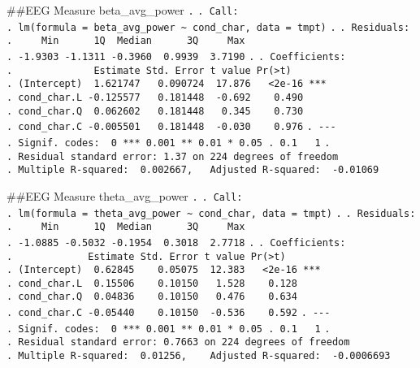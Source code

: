 \documentclass[
]{article}
\begin{document}
\#\#EEG Measure beta\_avg\_power \texttt{.} \texttt{.\ Call:}
\texttt{.\ lm(formula\ =\ beta\_avg\_power\ \textasciitilde{}\ cond\_char,\ data\ =\ tmpt)}
\texttt{.} \texttt{.\ Residuals:}
\texttt{.\ \ \ \ \ Min\ \ \ \ \ \ 1Q\ \ Median\ \ \ \ \ \ 3Q\ \ \ \ \ Max}
\texttt{.\ -1.9303\ -1.1311\ -0.3960\ \ 0.9939\ \ 3.7190} \texttt{.}
\texttt{.\ Coefficients:}
\texttt{.\ \ \ \ \ \ \ \ \ \ \ \ \ \ Estimate\ Std.\ Error\ t\ value\ Pr(\textgreater{}\textbar{}t\textbar{})}
\texttt{.\ (Intercept)\ \ 1.621747\ \ \ 0.090724\ \ 17.876\ \ \ \textless{}2e-16\ ***}
\texttt{.\ cond\_char.L\ -0.125577\ \ \ 0.181448\ \ -0.692\ \ \ \ 0.490}
\texttt{.\ cond\_char.Q\ \ 0.062602\ \ \ 0.181448\ \ \ 0.345\ \ \ \ 0.730}
\texttt{.\ cond\_char.C\ -0.005501\ \ \ 0.181448\ \ -0.030\ \ \ \ 0.976}
\texttt{.\ -\/-\/-}
\texttt{.\ Signif.\ codes:\ \ 0\ \textquotesingle{}***\textquotesingle{}\ 0.001\ \textquotesingle{}**\textquotesingle{}\ 0.01\ \textquotesingle{}*\textquotesingle{}\ 0.05\ \textquotesingle{}.\textquotesingle{}\ 0.1\ \textquotesingle{}\ \textquotesingle{}\ 1}
\texttt{.}
\texttt{.\ Residual\ standard\ error:\ 1.37\ on\ 224\ degrees\ of\ freedom}
\texttt{.\ Multiple\ R-squared:\ \ 0.002667,\ \ \ Adjusted\ R-squared:\ \ -0.01069}

\#\#EEG Measure theta\_avg\_power \texttt{.} \texttt{.\ Call:}
\texttt{.\ lm(formula\ =\ theta\_avg\_power\ \textasciitilde{}\ cond\_char,\ data\ =\ tmpt)}
\texttt{.} \texttt{.\ Residuals:}
\texttt{.\ \ \ \ \ Min\ \ \ \ \ \ 1Q\ \ Median\ \ \ \ \ \ 3Q\ \ \ \ \ Max}
\texttt{.\ -1.0885\ -0.5032\ -0.1954\ \ 0.3018\ \ 2.7718} \texttt{.}
\texttt{.\ Coefficients:}
\texttt{.\ \ \ \ \ \ \ \ \ \ \ \ \ Estimate\ Std.\ Error\ t\ value\ Pr(\textgreater{}\textbar{}t\textbar{})}
\texttt{.\ (Intercept)\ \ 0.62845\ \ \ \ 0.05075\ \ 12.383\ \ \ \textless{}2e-16\ ***}
\texttt{.\ cond\_char.L\ \ 0.15506\ \ \ \ 0.10150\ \ \ 1.528\ \ \ \ 0.128}
\texttt{.\ cond\_char.Q\ \ 0.04836\ \ \ \ 0.10150\ \ \ 0.476\ \ \ \ 0.634}
\texttt{.\ cond\_char.C\ -0.05440\ \ \ \ 0.10150\ \ -0.536\ \ \ \ 0.592}
\texttt{.\ -\/-\/-}
\texttt{.\ Signif.\ codes:\ \ 0\ \textquotesingle{}***\textquotesingle{}\ 0.001\ \textquotesingle{}**\textquotesingle{}\ 0.01\ \textquotesingle{}*\textquotesingle{}\ 0.05\ \textquotesingle{}.\textquotesingle{}\ 0.1\ \textquotesingle{}\ \textquotesingle{}\ 1}
\texttt{.}
\texttt{.\ Residual\ standard\ error:\ 0.7663\ on\ 224\ degrees\ of\ freedom}
\texttt{.\ Multiple\ R-squared:\ \ 0.01256,\ \ \ \ Adjusted\ R-squared:\ \ -0.0006693}
\end{document}
